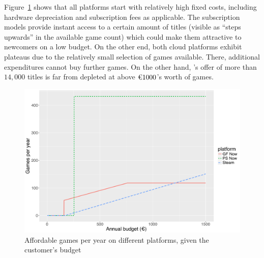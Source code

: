 
Figure~\ref{fig:gamesperyear-over-budget} shows that
all platforms start with relatively high fixed costs, including hardware
depreciation and subscription fees as applicable. The subscription
models provide instant access to a certain amount of titles (visible as
``steps upwards'' in the available game count) which could make them
attractive to newcomers on a low budget. On the other end, both cloud
platforms exhibit plateaus due to the relatively small selection of
games available. There, additional expenditures cannot buy further
games. On the other hand, \steam's offer of more than $14,000$
titles is far from depleted at above $\text{\texteuro} 1000$'s worth of
games.


\begin{figure}[!t]
	\centering
	\includegraphics[width=1.0\columnwidth]{images/gamesperyear-over-budget.pdf}
	\caption{Affordable games per year on different platforms, given the customer's budget}
\label{fig:gamesperyear-over-budget}
\end{figure}



